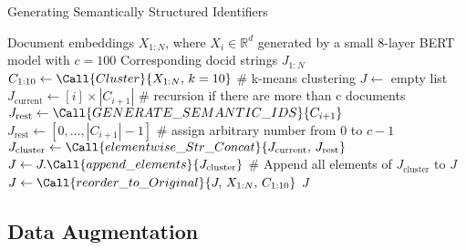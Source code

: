 \begin{algorithm}[H]
    \caption{Generating Semantically Structured Identifiers}
    \label{alg:semanticids}
    \begin{algorithmic}[1]
    \Require Document embeddings $X_{1:N}$, where $X_i \in \mathbb{R}^d$ generated by a small 8-layer BERT model with $c=100$
    \Ensure Corresponding docid strings $J_{1:N}$
        \State $C_{1:10} \gets \Call{Cluster}{X_{1:N},\, k=10}$ \# k-means clustering
        \State $J \gets$ empty list
            \State $J_{\text{current}} \gets [i] \times |C_{i+1}|$
             \# recursion if there are more than c documents
                \State $J_{\text{rest}} \gets \Call{GENERATE\_SEMANTIC\_IDS}{C_{i+1}}$
            \Else
                \State $J_{\text{rest}} \gets [0,\dots,|C_{i+1}| - 1]$ \# assign arbitrary number from 0 to $c-1$
            \EndIf
            \State $J_{\text{cluster}} \gets \Call{elementwise\_Str\_Concat}{J_{\text{current}},\,J_{\text{rest}}}$
            \State $J \gets J.\Call{append\_elements}{J_{\text{cluster}}}$ \# Append all elements of $J_{\text{cluster}}$ to $J$
        \EndFor
        \State $J \gets \Call{reorder\_to\_Original}{J,\,X_{1:N},\,C_{1:10}}$
        \State \Return $J$
    \EndFunction
    \end{algorithmic}
    \end{algorithm}
\subsection{Data Augmentation}

